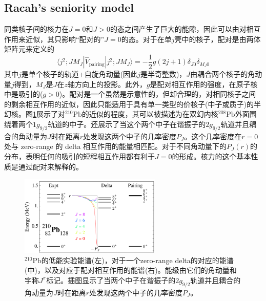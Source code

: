 \subsection{Racah's seniority model}
同类核子间的核力在$J=0$和$J>0$的态之间产生了巨大的能隙，因此可以由对相互作用来近似，其只影响“配对的”$J=0$的态。对于在单$j$壳中的核子，配对是由两体矩阵元来定义的
\begin{equation}\label{eq_eq8}
\langle j^2;JM_J|\widehat{V}_\textrm{pairing}|j^2;JM_J\rangle=-\frac{1}{2}g(2j+1)\delta_{J0}\delta_{M_J0}
\end{equation}
其中$j$是单个核子的轨道+自旋角动量(因此$j$是半奇整数)，$J$由耦合两个核子的角动量$j$得到，$M_J$是$J$在$z$轴方向上的投影。此外，$g$是配对相互作用的强度，在原子核中是吸引的($g>0$)。配对是一个虽然是示意性的，但却合理的，对相同核子之间的剩余相互作用的近似，因此只能适用于具有单一类型的价核子(中子或质子)的半幻核。图\ref{fig_Pb210}展示了对${}^{210}\textrm{Pb}$的近似的程度，其可以被描述为在双幻内核${}^{208}\textrm{Pb}$外面围绕着两个$1\textit{g}_{9/2}$轨道的中子。还展示了当这个两个中子在谐振子的$2g_{9/2}$轨道并且耦合的角动量为$J$时在距离$r$处发现这两个中子的几率密度$P_J$。这个几率密度在$r=0$处与 zero-range 的 delta 相互作用的能量相匹配。对于不同角动量下的$P_J(r)$的分布，表明任何的吸引的短程相互作用都有利于$J=0$的形成。核力的这个基本性质是通过配对来解释的。
\begin{figure}[H]
\centering
\includegraphics[width=0.6\textwidth]{figure/F_Pb210.png}
\caption{${}^{210}\textrm{Pb}$的低能实验能谱(左)，对于一个zero-range delta的对应的能谱(中)，以及对应于配对相互作用的能谱(右)。能级由它们的角动量和宇称$J^\pi$标记。插图显示了当两个中子在谐振子的$2g_{9/2}$轨道并且耦合的角动量为$J$时在距离$r$处发现这两个中子的几率密度$P_J$。\label{fig_Pb210}}
\end{figure}

